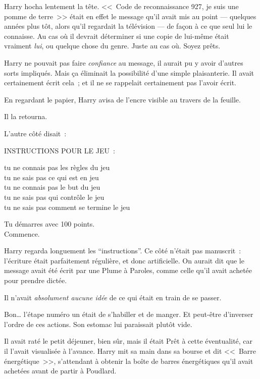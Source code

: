Harry hocha lentement la tête. <<~Code de reconnaissance 927, je suis une pomme de terre~>> était en effet le message qu'il avait mis au point — quelques années plus tôt, alors qu'il regardait la télévision — de façon à ce que seul lui le connaisse. Au cas où il devrait déterminer si une copie de lui-même était vraiment \emph{lui}, ou quelque chose du genre. Juste au cas où. Soyez prêts.

Harry ne pouvait pas faire \emph{confiance} au message, il aurait pu y avoir d'autres sorts impliqués. Mais ça éliminait la possibilité d'une simple plaisanterie. Il avait certainement écrit cela~; et il ne se rappelait certainement pas l'avoir écrit.

En regardant le papier, Harry avisa de l'encre visible au travers de la feuille.

Il la retourna.

L'autre côté disait~:

\begin{writtenNote}\centering
\textsc{INSTRUCTIONS POUR LE JEU~:}

tu ne connais pas les règles du jeu\\
tu ne sais pas ce qui est en jeu\\
tu ne connais pas le but du jeu\\
tu ne sais pas qui contrôle le jeu\\
tu ne sais pas comment se termine le jeu


Tu démarres avec 100 points.\\
Commence.
\end{writtenNote}

Harry regarda longuement les “instructions”. Ce côté n'était pas manuscrit~: l'écriture était parfaitement régulière, et donc artificielle. On aurait dit que le message avait été écrit par une Plume à Paroles, comme celle qu'il avait achetée pour prendre dictée.

Il n'avait \emph{absolument aucune idée} de ce qui était en train de se passer.

Bon… l'étape numéro un était de s'habiller et de manger. Et peut-être d'inverser l'ordre de ces actions. Son estomac lui paraissait plutôt vide.

Il avait raté le petit déjeuner, bien sûr, mais il était Prêt à cette éventualité, car il l'avait visualisée à l'avance. Harry mit sa main dans sa bourse et dit <<~Barre énergétique~>>, s'attendant à obtenir la boîte de barres énergétiques qu'il avait achetées avant de partir à Poudlard.

